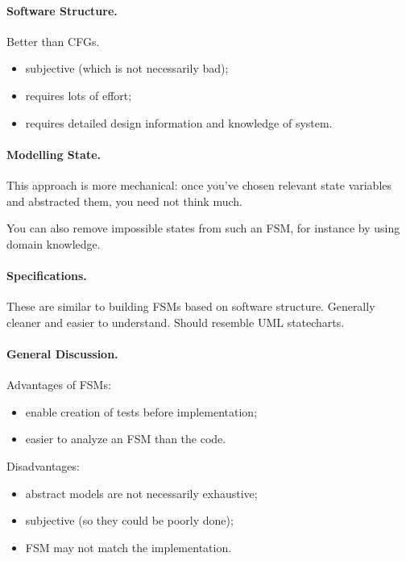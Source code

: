 \documentclass[11pt]{article}
\begin{document}
\paragraph{Software Structure.} Better than CFGs.
\begin{itemize}
\item subjective (which is not necessarily bad);
\item requires lots of effort;
\item requires detailed design information and knowledge of system.
\end{itemize}

\paragraph{Modelling State.} 
This approach is more mechanical: once you've chosen relevant state
variables and abstracted them, you need not think much.

You can also remove impossible states from such an FSM, for instance
by using domain knowledge.

\paragraph{Specifications.}
These are similar to building FSMs based on software structure.
Generally cleaner and easier to understand. Should resemble UML
statecharts.

\paragraph{General Discussion.} Advantages of FSMs:
\begin{itemize}
\item enable creation of tests before implementation;
\item easier to analyze an FSM than the code.
\end{itemize}
Disadvantages:
\begin{itemize}
\item abstract models are not necessarily exhaustive;
\item subjective (so they could be poorly done);
\item FSM may not match the implementation.
\end{itemize}
\end{document}
